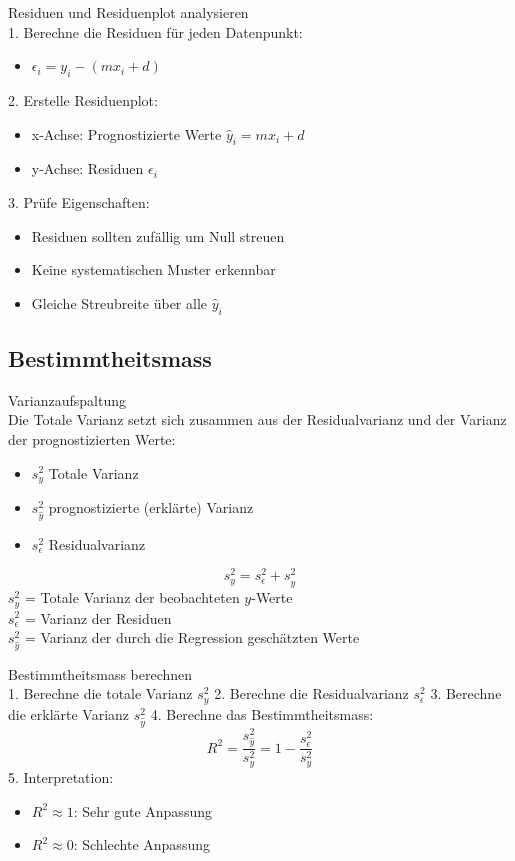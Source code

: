 \begin{KR}{Residuen und Residuenplot analysieren}\\
1. Berechne die Residuen für jeden Datenpunkt:
   \begin{itemize}
     \item $\epsilon_i = y_i - (mx_i + d)$
   \end{itemize}
2. Erstelle Residuenplot:
   \begin{itemize}
     \item x-Achse: Prognostizierte Werte $\hat{y}_i = mx_i + d$
     \item y-Achse: Residuen $\epsilon_i$
   \end{itemize}
3. Prüfe Eigenschaften:
   \begin{itemize}
     \item Residuen sollten zufällig um Null streuen
     \item Keine systematischen Muster erkennbar
     \item Gleiche Streubreite über alle $\hat{y}_i$
   \end{itemize}
\end{KR}

\subsection{Bestimmtheitsmass}
\begin{concept}{Varianzaufspaltung}\\
Die Totale Varianz setzt sich zusammen aus der Residualvarianz und der Varianz der prognostizierten Werte:
\begin{itemize}
  \item $s_y^2$ Totale Varianz
  \item $s_{\hat{y}}^2$ prognostizierte (erklärte) Varianz
  \item $s_{\epsilon}^2$ Residualvarianz
\end{itemize}

$$
s_y^2=s_{\epsilon}^2+s_{\hat{y}}^2
$$
$s_y^2$ = Totale Varianz der beobachteten $y$-Werte\\
$s_{\epsilon}^2$ = Varianz der Residuen\\
$s_{\hat{y}}^2$ = Varianz der durch die Regression geschätzten Werte\\
\end{concept}

\begin{KR}{Bestimmtheitsmass berechnen}\\
1. Berechne die totale Varianz $s_y^2$
2. Berechne die Residualvarianz $s_{\epsilon}^2$
3. Berechne die erklärte Varianz $s_{\hat{y}}^2$
4. Berechne das Bestimmtheitsmass:
   $$R^2 = \frac{s_{\hat{y}}^2}{s_y^2} = 1 - \frac{s_{\epsilon}^2}{s_y^2}$$
5. Interpretation:
   \begin{itemize}
     \item $R^2 \approx 1$: Sehr gute Anpassung
     \item $R^2 \approx 0$: Schlechte Anpassung
   \end{itemize}
\end{KR}


